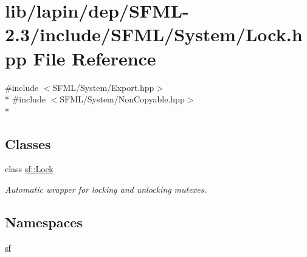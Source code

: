 \hypertarget{lapin_2dep_2_s_f_m_l-2_83_2include_2_s_f_m_l_2_system_2_lock_8hpp}{\section{lib/lapin/dep/\-S\-F\-M\-L-\/2.3/include/\-S\-F\-M\-L/\-System/\-Lock.hpp File Reference}
\label{lapin_2dep_2_s_f_m_l-2_83_2include_2_s_f_m_l_2_system_2_lock_8hpp}
}
{\ttfamily \#include $<$S\-F\-M\-L/\-System/\-Export.\-hpp$>$}\\*
{\ttfamily \#include $<$S\-F\-M\-L/\-System/\-Non\-Copyable.\-hpp$>$}\\*
\subsection*{Classes}
\begin{DoxyCompactItemize}
\item 
class \hyperlink{classsf_1_1_lock}{sf\-::\-Lock}
\begin{DoxyCompactList}\small\item\em Automatic wrapper for locking and unlocking mutexes. \end{DoxyCompactList}\end{DoxyCompactItemize}
\subsection*{Namespaces}
\begin{DoxyCompactItemize}
\item 
\hyperlink{namespacesf}{sf}
\end{DoxyCompactItemize}
